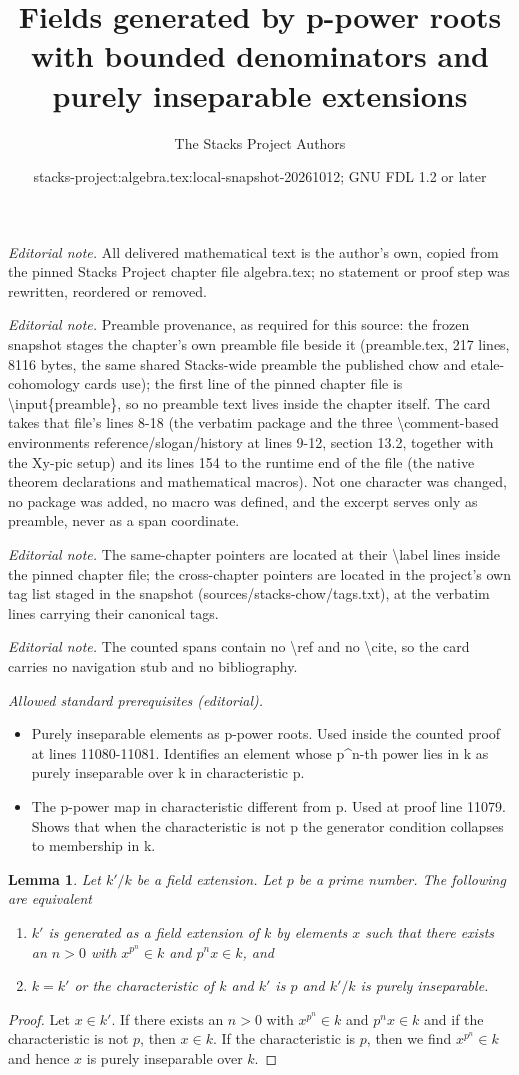 \documentclass[10pt,a4paper]{amsart}
\title{Fields generated by p-power roots with bounded denominators and purely inseparable extensions}
\author{The Stacks Project Authors}
\date{stacks-project:algebra.tex:local-snapshot-20261012; GNU FDL 1.2 or later}
\theoremstyle{plain}
\newtheorem{lemma}[subsection]{Lemma}
\theoremstyle{definition}
\theoremstyle{remark}
\numberwithin{equation}{subsection}
\begin{document}
\maketitle
\noindent\textit{Editorial note.} All delivered mathematical text is the author's own, copied from the pinned Stacks Project chapter file algebra.tex; no statement or proof step was rewritten, reordered or removed.\par\medskip
\noindent\textit{Editorial note.} Preamble provenance, as required for this source: the frozen snapshot stages the chapter's own preamble file beside it (preamble.tex, 217 lines, 8116 bytes, the same shared Stacks-wide preamble the published chow and etale-cohomology cards use); the first line of the pinned chapter file is \textbackslash{}input\{preamble\}, so no preamble text lives inside the chapter itself. The card takes that file's lines 8-18 (the verbatim package and the three \textbackslash{}comment-based environments reference/slogan/history at lines 9-12, section 13.2, together with the Xy-pic setup) and its lines 154 to the runtime end of the file (the native theorem declarations and mathematical macros). Not one character was changed, no package was added, no macro was defined, and the excerpt serves only as preamble, never as a span coordinate.\par\medskip
\noindent\textit{Editorial note.} The same-chapter pointers are located at their \textbackslash{}label lines inside the pinned chapter file; the cross-chapter pointers are located in the project's own tag list staged in the snapshot (sources/stacks-chow/tags.txt), at the verbatim lines carrying their canonical tags.\par\medskip
\noindent\textit{Editorial note.} The counted spans contain no \textbackslash{}ref and no \textbackslash{}cite, so the card carries no navigation stub and no bibliography.\par\medskip
\noindent\textit{Allowed standard prerequisites (editorial).}\begin{itemize}
\item Purely inseparable elements as p-power roots. Used inside the counted proof at lines 11080-11081. Identifies an element whose p\textasciicircum{}n-th power lies in k as purely inseparable over k in characteristic p.
\item The p-power map in characteristic different from p. Used at proof line 11079. Shows that when the characteristic is not p the generator condition collapses to membership in k.
\end{itemize}\medskip
\begin{lemma}
\label{lemma-p-ring-map-field}
Let $k'/k$ be a field extension. Let $p$ be a prime number.
The following are equivalent
\begin{enumerate}
\item $k'$ is generated as a field extension of $k$ by elements
$x$ such that there exists an $n > 0$ with $x^{p^n} \in k$ and
$p^nx \in k$, and
\item $k = k'$ or the characteristic of $k$
and $k'$ is $p$ and $k'/k$ is purely inseparable.
\end{enumerate}
\end{lemma}

\begin{proof}
Let $x \in k'$. If there exists an $n > 0$ with $x^{p^n} \in k$ and
$p^nx \in k$ and if the characteristic is not $p$, then $x \in k$.
If the characteristic is $p$, then we find $x^{p^n} \in k$
and hence $x$ is purely inseparable over $k$.
\end{proof}
\end{document}
